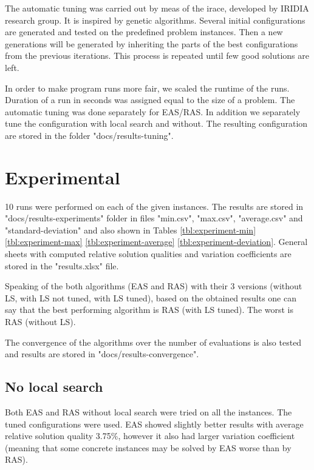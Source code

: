 \documentclass[12pt]{article}
\begin{document}
The automatic tuning was carried out by meas of the irace, developed by IRIDIA research group. It is inspired by genetic algorithms. Several initial configurations are generated and tested on the predefined problem instances. Then a new generations will be generated by inheriting the parts of the best configurations from the previous iterations. This process is repeated until few good solutions are left.

In order to make program runs more fair, we scaled the runtime of the runs. Duration of a run in seconds was assigned equal to the size of a problem. The automatic tuning was done separately for EAS/RAS. In addition we separately tune the configuration with local search and without. The resulting configuration are stored in the folder "docs/results-tuning".

\section{Experimental}


10 runs were performed on each of the given instances. The results are stored in "docs/results-experiments" folder in files "min.csv", "max.csv", "average.csv" and "standard-deviation" and also shown in Tables \ref{tbl:experiment-min} \ref{tbl:experiment-max} \ref{tbl:experiment-average} \ref{tbl:experiment-deviation}. General sheets with computed relative solution qualities and variation coefficients are stored in the "results.xlsx" file.

Speaking of the both algorithms (EAS and RAS) with their 3 versions (without LS, with LS not tuned, with LS tuned), based on the obtained results one can say that the best performing algorithm is RAS (with LS tuned). The worst is RAS (without LS).

The convergence of the algorithms over the number of evaluations is also tested and results are stored in "docs/results-convergence".

\subsection{No local search}

Both EAS and RAS without local search were tried on all the instances. The tuned configurations were used. EAS showed slightly better results with average relative solution quality 3.75\%, however it also had larger variation coefficient (meaning that some concrete instances may be solved by EAS worse than by RAS).
\end{document}
